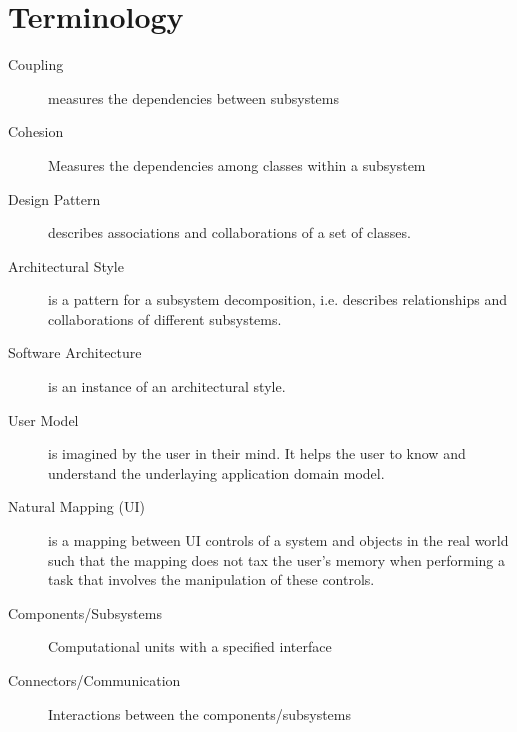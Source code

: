 
\section{Terminology}
\begin{description}
  \item[Coupling] measures the dependencies between subsystems

  \item[Cohesion] Measures the dependencies among classes within a subsystem

  \item[Design Pattern] describes associations and collaborations of a set of classes.

  \item[Architectural Style] is a pattern for a subsystem decomposition, i.e. describes relationships and collaborations of different subsystems.

  \item[Software Architecture] is an instance of an architectural style.

  \item[User Model] is imagined by the user in their mind.
  It helps the user to know and understand the underlaying application domain model.

  \item[Natural Mapping (UI)] is a mapping between UI controls of a system and objects in the real world such that the mapping does not tax the user's memory when performing a task that involves the manipulation of these controls.

  \item[Components/Subsystems] Computational units with a specified interface

  \item[Connectors/Communication] Interactions between the components/subsystems
\end{description}
